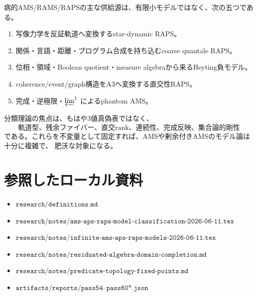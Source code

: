 \documentclass[uplatex,dvipdfmx,a4paper,10pt]{jsarticle}
\begin{document}
病的AMS/RAMS/RAPSの主な供給源は、有限小モデルではなく、次の五つである。
\begin{enumerate}
  \item 写像力学を反証軌道へ変換するstar-dynamic RAPS。
  \item 関係・言語・距離・プログラム合成を持ち込むcoarse quantale RAPS。
  \item 位相・領域・Boolean quotient・measure algebraから来るHeyting負モデル。
  \item coherence/event/graph構造をA3へ変換する直交性RAPS。
  \item 完成・逆極限・\(\varprojlim^1\) によるphantom AMS。
\end{enumerate}
分類理論の焦点は、もはや3値真偽表ではなく、
\[
\text{軌道型、残余ファイバー、直交rank、連続性、完成反映、集合論的剛性}
\]
である。これらを不変量として固定すれば、AMSや剰余付きAMSのモデル論は十分に複雑で、
肥沃な対象になる。

\section*{参照したローカル資料}
\begin{itemize}
  \item \(\texttt{research/definitions.md}\)
  \item \(\texttt{research/notes/ams-aps-raps-model-classification-2026-06-11.tex}\)
  \item \(\texttt{research/notes/infinite-ams-aps-raps-models-2026-06-11.tex}\)
  \item \(\texttt{research/notes/residuated-algebra-domain-completion.md}\)
  \item \(\texttt{research/notes/predicate-topology-fixed-points.md}\)
  \item \(\texttt{artifacts/reports/pass54--pass60*.json}\)
\end{itemize}
\end{document}
